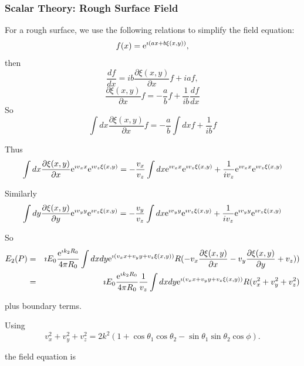 \documentclass[11pt,openany]{report}
\newcommand{\pder}[2]{\frac{\partial {#1}}{\partial {#2}}}
\newcommand{\der}[2]{\frac{d {#1}}{d {#2}}}
\newcommand{\e}{{\rm e}}
\begin{document}
{{%
\subsubsection{Scalar Theory: Rough Surface Field}

For a rough surface, we use the following relations to simplify the field equation:
  \begin{equation}
f(x)=\e^{\imath (ax+b\xi(x,y))},
  \end{equation}
then
  \begin{equation}
\der{f}{x}=ib\pder{\xi(x,y)}{x}f+iaf,
  \end{equation}
  \begin{equation}
\pder{\xi(x,y)}{x}f=-\frac{a}{b}f+\frac{1}{ib}\der{f}{x}
  \end{equation}
So
  \begin{equation}
\int dx\pder{\xi(x,y)}{x}f=-\frac{a}{b}\int dx f+\frac{1}{ib}f
  \end{equation}

Thus
  \begin{equation}
\int dx\pder{\xi(x,y)}{x}\e^{\imath v_{x}x}\e^{\imath v_{z}\xi(x,y)}=-\frac{v_{x}}{v_{z}}\int dx \e^{\imath v_{x}x}\e^{\imath v_{z}\xi(x,y)}+\frac{1}{iv_{z}}\e^{\imath v_{x}x}\e^{\imath v_{z}\xi(x,y)}
  \end{equation}

Similarly
  \begin{equation}
\int dy\pder{\xi(x,y)}{y}\e^{\imath v_{y}y}\e^{\imath v_{z}\xi(x,y)}=-\frac{v_{y}}{v_{z}}\int dx \e^{\imath v_{y}y}\e^{\imath v_{z}\xi(x,y)}+\frac{1}{iv_{z}}\e^{\imath v_{y}y}\e^{\imath v_{z}\xi(x,y)}
  \end{equation}

So
\begin{eqnarray}
E_{2}(P)&=&\imath E_{0}\frac{\e^{\imath k_{2}R_{0}}}{4\pi R_{0}}\int dx dy\e^{\imath( v_{x}x+v_{y}y+v_{z}\xi(x,y))}R(-v_{x}\pder{\xi(x,y)}{x}-v_{y}\pder{\xi(x,y)}{y}+v_{z})
)\\
&=&\imath E_{0}\frac{\e^{\imath k_{2}R_{0}}}{4\pi R_{0}}\frac{1}{v_{z}}\int dx dy\e^{\imath( v_{x}x+v_{y}y+v_{z}\xi(x,y))}R(v_{x}^{2}+v_{y}^{2}+v_{z}^{2})
\end{eqnarray}

plus boundary terms.

Using
$$v_{x}^{2}+v_{y}^{2}+v_{z}^{2}=2k^{2}\left(1+\cos\theta_{1}\cos\theta_{2}-\sin\theta_{1}\sin\theta_{2}\cos\phi\right).$$

the field equation is

}}
\end{document}
